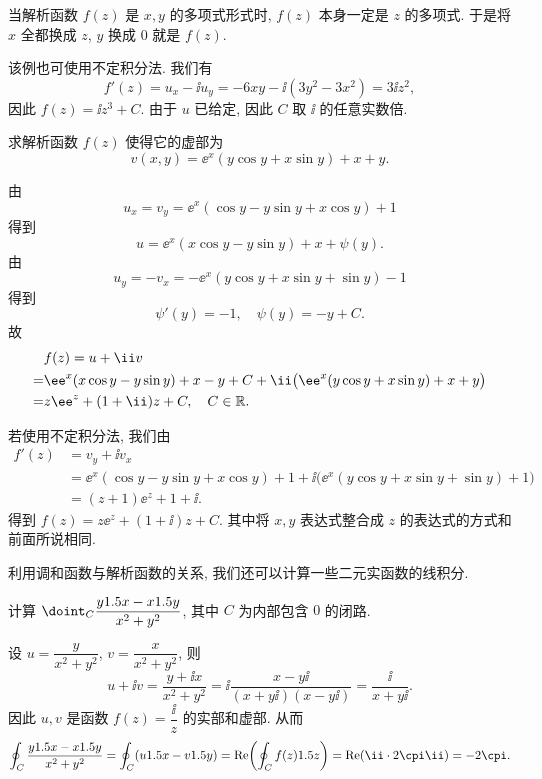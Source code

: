 当解析函数 $f(z)$ 是 $x,y$ 的多项式形式时, $f(z)$ 本身一定是 $z$ 的多项式.
于是将 $x$ 全都换成 $z$, $y$ 换成 $0$ 就是 $f(z)$.

该例也可使用不定积分法.
我们有
\[
  f'(z)=u_x-\ii u_y=-6xy-\ii (3y^2-3x^2)=3\ii z^2,
\]
因此 $f(z)=\ii z^3+C$. 由于 $u$ 已给定, 因此 $C$ 取 $\ii$ 的任意实数倍.

\begin{example}
  求解析函数 $f(z)$ 使得它的虚部为
  \[
    v(x,y)=\ee^x(y\cos y+x\sin y)+x+y.
  \]
\end{example}

\begin{solution}
  由
  \[
    u_x=v_y=\ee^x(\cos y-y\sin y+x\cos y)+1
  \]
  得到
  \[
    u=\ee^x(x\cos y-y\sin y)+x+\psi(y).
  \]
  由
  \[
    u_y=-v_x=-\ee^x(y\cos y+x\sin y+\sin y)-1
  \]
  得到
  \[
    \psi'(y)=-1,\quad\psi(y)=-y+C.
  \]
  故
  \begin{align*}
    &f(z)=u+\ii v\\
    =&\ee^x(x\cos y-y\sin y)+x-y+C+\ii\bigl(\ee^x(y\cos y+x\sin y)+x+y\bigr)\\
    =&z\ee^z+(1+\ii)z+C,\quad C\in\BR.
  \end{align*}
\end{solution}

若使用不定积分法, 我们由
\begin{align*}
    f'(z)&=v_y+\ii v_x\\&
  =\ee^x(\cos y-y\sin y+x\cos y)+1+\ii\bigl(\ee^x(y\cos y+x\sin y+\sin y)+1\bigr)\\&
  =(z+1)\ee^z+1+\ii.
\end{align*}
得到 $f(z)=z\ee^z+(1+\ii)z+C$.
其中将 $x,y$ 表达式整合成 $z$ 的表达式的方式和前面所说相同.

利用调和函数与解析函数的关系, 我们还可以计算一些二元实函数的线积分.

\begin{example}
  计算 $\doint_C \dfrac{y\d x-x\d y}{x^2+y^2}$, 其中 $C$ 为内部包含 $0$ 的闭路.
\end{example}

\begin{solution}
  设 $u=\dfrac{y}{x^2+y^2}$, $v=\dfrac{x}{x^2+y^2}$, 则
  \[
     u+\ii v
    =\frac{y+\ii x}{x^2+y^2}
    =\ii\frac{x-y\ii}{(x+y\ii)(x-y\ii)}
    =\frac{\ii}{x+y\ii}.
  \]
  因此 $u,v$ 是函数 $f(z)=\dfrac{\ii}{z}$ 的实部和虚部.
  从而
  \[
     \oint_C \dfrac{y\d x-x\d y}{x^2+y^2}
    =\oint_C (u\d x-v\d y)
    =\Re\biggl(\oint_C f(z)\d z\biggr)
    =\Re(\ii\cdot 2\cpi\ii)
    =-2\cpi.
  \]
\end{solution}



